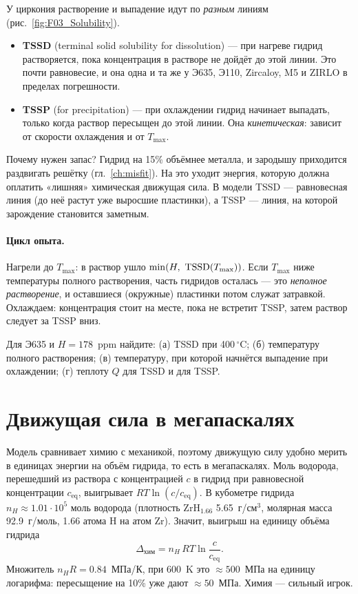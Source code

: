 У циркония растворение и выпадение идут по \emph{разным} линиям (рис.~\ref{fig:F03_Solubility}).
\begin{itemize}
\item \textbf{TSSD} (terminal solid solubility for dissolution) --- при нагреве гидрид растворяется,
  пока концентрация в растворе не дойдёт до этой линии. Это почти равновесие, и она одна и та же
  у Э635, Э110, Zircaloy, M5 и ZIRLO в пределах погрешности.
\item \textbf{TSSP} (for precipitation) --- при охлаждении гидрид начинает выпадать, только когда
  раствор пересыщен до этой линии. Она \emph{кинетическая}: зависит от скорости охлаждения и
  от $T_{\max}$.
\end{itemize}
Почему нужен запас? Гидрид на 15\% объёмнее металла, и зародышу приходится раздвигать решётку
(гл.~\ref{ch:misfit}). На это уходит энергия, которую должна оплатить «лишняя» химическая
движущая сила. В модели TSSD --- равновесная линия (до неё растут уже выросшие пластинки), а
TSSP --- линия, на которой зарождение становится заметным.

\paragraph{Цикл опыта.} Нагрели до $T_{\max}$: в раствор ушло $\min(H,\ \TSSD(T_{\max}))$.
Если $T_{\max}$ ниже температуры полного растворения, часть гидридов осталась --- это
\emph{неполное растворение}, и оставшиеся (окружные) пластинки потом служат затравкой.
Охлаждаем: концентрация стоит на месте, пока не встретит TSSP, затем раствор следует за TSSP вниз.

\begin{exercise}
Для Э635 и $H=178$~ppm найдите: (а) TSSD при 400\,$^\circ$C; (б) температуру полного
растворения; (в) температуру, при которой начнётся выпадение при охлаждении; (г) теплоту $Q$
для TSSD и для TSSP.
\end{exercise}

\section{Движущая сила в мегапаскалях}

Модель сравнивает химию с механикой, поэтому движущую силу удобно мерить в единицах энергии
на объём гидрида, то есть в мегапаскалях. Моль водорода, перешедший из раствора с концентрацией
$c$ в гидрид при равновесной концентрации $c_{\text{eq}}$, выигрывает $RT\ln(c/c_{\text{eq}})$.
В кубометре гидрида $n_H\approx1.01\cdot10^5$ моль водорода (плотность ZrH$_{1.66}$ 5.65~г/см$^3$,
молярная масса 92.9~г/моль, 1.66 атома H на атом Zr). Значит, выигрыш на единицу объёма
гидрида
\begin{equation}
\Delta_{\text{хим}}=n_H\,RT\ln\frac{c}{c_{\text{eq}}}.
\end{equation}
Множитель $n_H R=0.84$~МПа/К, при 600~K это $\approx500$~МПа на единицу логарифма: пересыщение на
10\% уже дают $\approx50$~МПа. Химия --- сильный игрок.


